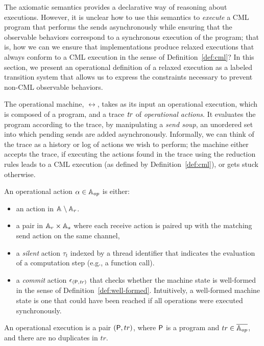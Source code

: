 The axiomatic semantics provides a declarative way of reasoning about
executions. However, it is unclear how to use this semantics to
\emph{execute} a CML program that performs the sends asynchronously
while ensuring that the observable behaviors correspond to a
synchronous execution of the program; that is, how we can we ensure
that implementations produce relaxed executions that always conform to
a CML execution in the sense of Definition~\ref{def:cml}?  In this
section, we present an operational definition of a relaxed execution
as a labeled transition system that allows us to express the
constraints necessary to prevent non-CML observable behaviors.

The operational machine, $\rel$, takes as its input an operational execution,
which is composed of a program, and a trace $\mathit{tr}$ of \emph{operational
actions}. It evaluates the program according to the trace, by manipulating a
\emph{send soup}, an unordered set into which pending sends are added
asynchronously.  Informally, we can think of the trace as a history or log of
actions we wish to perform; the machine either accepts the trace, if executing
the actions found in the trace using the reduction rules leads to a CML
execution (as defined by Definition~\ref{def:cml}), or gets stuck otherwise.

\begin{definition}
\label{def:op_act}
An operational action $\alpha \in \mathbb{A}_{op}$ is either:

\begin{itemize}
\item an action in $\mathbb{A}_{} \setminus \mathbb{A}_{r}$.
\item a pair in $\mathbb{A}_{r} \times \mathbb{A}_{s}$ where each receive
	action is paired up with the matching send action on the same channel,
\item a \emph{silent} action $\tau_t$ indexed by a thread identifier that
  indicates the evaluation of a computation step (e.g., a function call).
\item a \emph{commit} action $\epsilon_{({\sf P},\mathit{tr})}$ that checks whether
  the machine state is well-formed in the sense of
  Definition~\ref{def:well-formed}.  Intuitively, a well-formed machine
  state is one that could have been reached if all  operations
  were executed synchronously.
\end{itemize}
\end{definition}

\begin{definition}
An operational execution is a pair $({\sf P},tr)$, where ${\sf P}$ is a
program and $tr \in \overline{\mathbb{A}_{op}}$, and there are no duplicates in
$tr$.
\end{definition}

